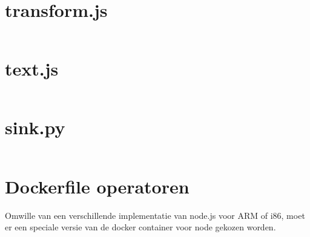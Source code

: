 \documentclass[twocolumn, a4paper]{article}
\begin{document}
\section{transform.js}
\inputminted[breaklines=true]{javascript}{code/transform.js}

\section{text.js}
\inputminted[breaklines=true]{javascript}{code/filter.js}


\section{sink.py}
\inputminted[breaklines=true]{python}{code/output.py}

\section{Dockerfile operatoren}
Omwille van een verschillende implementatie van node.js voor ARM of i86, moet er een speciale versie van de docker container voor node gekozen worden. 
\inputminted[breaklines=true]{docker}{code/Dockerfile}

\end{document}
